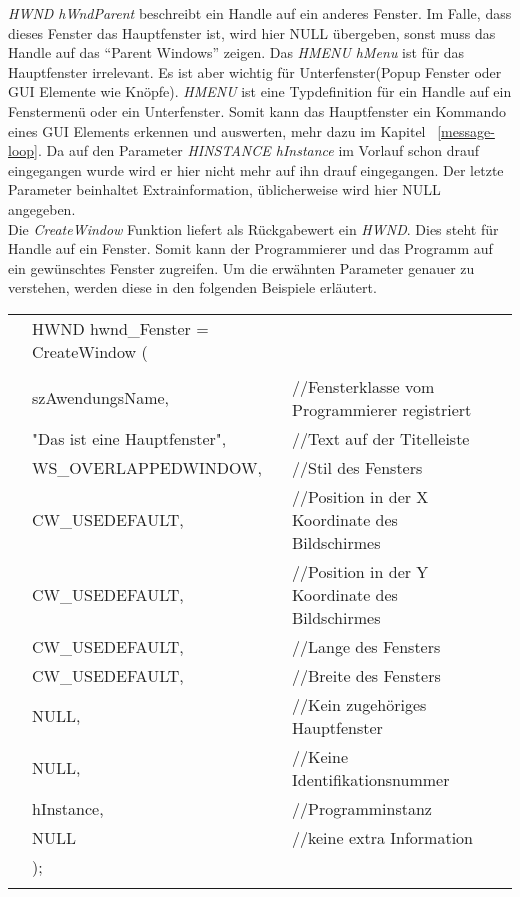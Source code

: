 \textit{HWND hWndParent} beschreibt ein Handle auf ein anderes Fenster. Im Falle, dass dieses Fenster das Hauptfenster ist, wird hier NULL übergeben, sonst muss das Handle auf das "`Parent Windows"' zeigen. Das \textit{HMENU hMenu} ist für das Hauptfenster irrelevant. Es ist aber wichtig für Unterfenster(Popup Fenster oder GUI Elemente wie Knöpfe). \textit{HMENU} ist eine Typdefinition für ein Handle auf ein Fenstermenü oder ein Unterfenster. Somit kann das Hauptfenster ein Kommando eines GUI Elements erkennen und auswerten, mehr dazu im Kapitel ~\ref{message-loop}. Da auf den Parameter \textit{HINSTANCE hInstance} im Vorlauf schon drauf eingegangen wurde wird er hier nicht mehr auf ihn drauf eingegangen. Der letzte Parameter beinhaltet Extrainformation, üblicherweise wird hier NULL angegeben.\\

Die \textit{CreateWindow} Funktion liefert als Rückgabewert ein \textit{HWND}. Dies steht für Handle auf ein Fenster. Somit kann der Programmierer und das Programm auf ein gewünschtes Fenster zugreifen. Um die erwähnten Parameter genauer zu verstehen, werden diese in den folgenden Beispiele erläutert.\\

\begin{tabular}{llll}
& HWND hwnd\_Fenster = CreateWindow (\\
\\
& szAwendungsName,					& //Fensterklasse vom Programmierer registriert\\                            
& "Das ist eine Hauptfenster",  	& //Text auf der Titelleiste\\                                
& WS\_OVERLAPPEDWINDOW,              & //Stil des Fensters\\                         
& CW\_USEDEFAULT,                    & //Position in der X Koordinate des Bildschirmes\\     
& CW\_USEDEFAULT,                    & //Position in der Y Koordinate des Bildschirmes\\     
& CW\_USEDEFAULT,                    & //Lange des Fensters\\                                  
& CW\_USEDEFAULT,                    & //Breite des Fensters\\                                 
& NULL,                              & //Kein zugehöriges Hauptfenster\\                           
& NULL,                              & //Keine Identifikationsnummer\\                               
& hInstance,                         & //Programminstanz\\                                 
& NULL                               & //keine extra Information\\  
& );\\\\                 
\end{tabular} 

